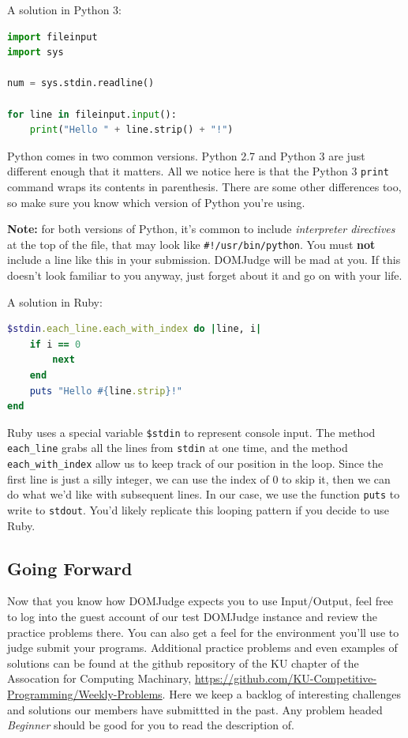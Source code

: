 \documentclass[a4paper]{article}
\begin{document}
A solution in Python 3:
\begin{lstlisting}[language=Python]
import fileinput
import sys

num = sys.stdin.readline()

for line in fileinput.input():
    print("Hello " + line.strip() + "!")
\end{lstlisting}
Python comes in two common versions. Python 2.7 and Python 3 are just different enough that it matters. All we notice here is that the Python 3 \texttt{print} command wraps its contents in parenthesis. There are some other differences too, so make sure you know which version of Python you're using. 

\textbf{Note:} for both versions of Python, it's common to include \textit{interpreter directives} at the top of the file, that may look like \texttt{\#!/usr/bin/python}. You must \textbf{not} include a line like this in your submission. DOMJudge will be mad at you. If this doesn't look familiar to you anyway, just forget about it and go on with your life. 

A solution in Ruby:
\begin{lstlisting}[language=Ruby]
$stdin.each_line.each_with_index do |line, i|
    if i == 0
        next
    end
    puts "Hello #{line.strip}!"
end
\end{lstlisting}

Ruby uses a special variable \texttt{\$stdin} to represent console input. The method \texttt{each\_line} grabs all the lines from \texttt{stdin} at one time, and the method \texttt{each\_with\_index} allow us to keep track of our position in the loop. Since the first line is just a silly integer, we can use the index of 0 to skip it, then we can do what we'd like with subsequent lines. In our case, we use the function \texttt{puts} to write to \texttt{stdout}. You'd likely replicate this looping pattern if you decide to use Ruby.

\subsection{Going Forward}
Now that you know how DOMJudge expects you to use Input/Output, feel free to log into the guest account of our test DOMJudge instance and review the practice problems there. You can also get a feel for the environment you'll use to judge submit your programs. Additional practice problems and even examples of solutions can be found at the github repository of the KU chapter of the Assocation for Computing Machinary, \url{https://github.com/KU-Competitive-Programming/Weekly-Problems}. Here we keep a backlog of interesting challenges and solutions our members have submittted in the past. Any problem headed \textit{Beginner} should be good for you to read the description of. 
\end{document}
